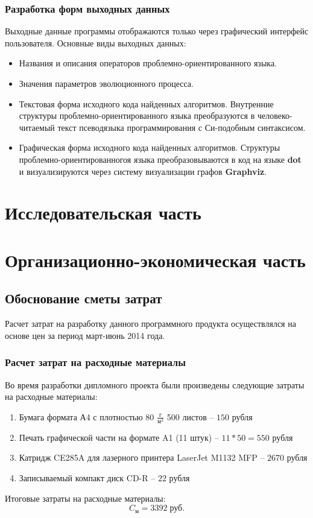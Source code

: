 \documentclass[russian,utf8,emptystyle]{eskdtext}
\begin{document}
\begin{spacing}{1.5}
\subsubsection{Разработка форм выходных данных}

Выходные данные программы отображаются только через графический интерфейс пользователя. Основные виды выходных данных:
\begin{itemize}
\item Названия и описания операторов проблемно-ориентированного языка.
\item Значения параметров эволюционного процесса.
\item Текстовая форма исходного кода найденных алгоритмов. Внутренние структуры проблемно-ориентированного языка преобразуются в человеко-читаемый текст псеводязыка программирования с Си-подобным синтаксисом.
\item Графическая форма исходного кода найденных алгоритмов. Структуры проблемно-ориентированногоя языка преобразовываются в код на языке \textbf{dot} и визуализируются через систему визуализации графов \textbf{Graphviz}.
\end{itemize}


\newpage
\section{Исследовательская часть}

\newpage
\section{Организационно-экономическая часть}
\subsection{Обоснование сметы затрат}
Расчет затрат на разработку данного программного продукта осуществлялся на основе цен за период март-июнь 2014 года.
\subsubsection{Расчет затрат на расходные материалы}
Во время разработки дипломного проекта были произведены следующие затраты на расходные материалы:
\begin{enumerate}
\item Бумага формата А4 с плотностью 80 $\frac{\text{г}}{\text{м}^2}$ 500 листов -- $150$ рубля
\item Печать графической части на формате A1 (11 штук) -- $11 * 50 = 550$ рубля
\item Катридж CE285A для лазерного принтера LaserJet M1132 MFP -- $2670$ рубля
\item Записываемый компакт диск CD-R -- $22$ рубля
\end{enumerate}
Итоговые затраты на расходные материалы: 
$$
C_\text{м} = 3392 \; \text{руб.}
$$


\end{spacing}
\end{document}
